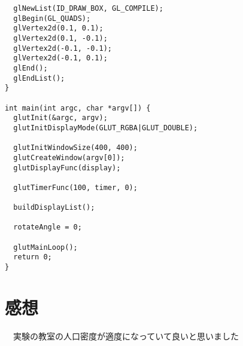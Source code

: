 \documentclass{scrartcl}
\begin{document}
\begin{verbatim}
  glNewList(ID_DRAW_BOX, GL_COMPILE);
  glBegin(GL_QUADS);
  glVertex2d(0.1, 0.1);
  glVertex2d(0.1, -0.1);
  glVertex2d(-0.1, -0.1);
  glVertex2d(-0.1, 0.1);
  glEnd();
  glEndList();
}

int main(int argc, char *argv[]) {
  glutInit(&argc, argv);
  glutInitDisplayMode(GLUT_RGBA|GLUT_DOUBLE);

  glutInitWindowSize(400, 400);
  glutCreateWindow(argv[0]);
  glutDisplayFunc(display);

  glutTimerFunc(100, timer, 0);

  buildDisplayList();

  rotateAngle = 0;

  glutMainLoop();
  return 0;
}
\end{verbatim}

\section{感想}
\label{sec:org03de8a0}
　実験の教室の人口密度が適度になっていて良いと思いました\\
\end{document}
